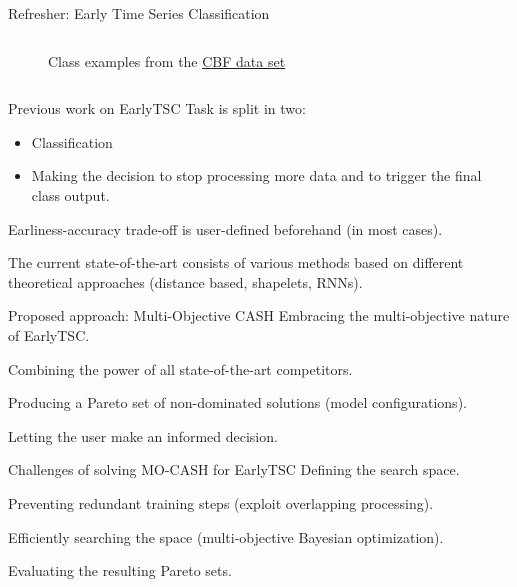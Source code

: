 \documentclass[t,11pt,aspectratio=169]{beamer}
\begin{document}
\begin{frame}[fragile]{Refresher: Early Time Series Classification}
\begin{columns}
\begin{column}{.45\textwidth}
{\begin{figure}
        \caption{Class examples from the \href{https://www.math.ucdavis.edu/~saito/publications/saito_phd.pdf}{CBF data set}\footnotemark}
        \label{fig:my_label}
    \end{figure}
}
\end{column}
\end{columns}
\end{frame}

\begin{frame}[fragile]{Previous work on EarlyTSC}
Task is split in two:
\begin{itemize}
    \item Classification
    \item Making the decision to stop processing more data and to \alert{trigger} the final class output.
\end{itemize}

Earliness-accuracy trade-off is user-defined beforehand (in most cases).

The current state-of-the-art consists of various methods based on different theoretical approaches (distance based, shapelets, RNNs).

\end{frame}

\begin{frame}[fragile]{Proposed approach: Multi-Objective CASH}
Embracing the multi-objective nature of EarlyTSC.

Combining the power of all state-of-the-art competitors.

Producing a Pareto set of non-dominated solutions (model configurations).

Letting the user make an informed decision.

\end{frame}

\begin{frame}[fragile]{Challenges of solving MO-CASH for EarlyTSC}
Defining the search space.

Preventing redundant training steps (exploit overlapping processing).

Efficiently searching the space (multi-objective Bayesian optimization).

Evaluating the resulting Pareto sets.
\end{frame}
\end{document}
